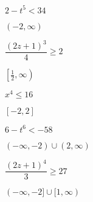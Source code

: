 \documentclass{ximera}
\begin{document}
\begin{question}
$2 - t^5 <  34$    %
\begin{solution}
$(-2, \infty)$ \vphantom{$\left[ \frac{1}{2}, \infty \right)$}
\end{solution}

\end{question}

\begin{question}
$\dfrac{(2z+1)^3}{4} \geq 2$ %

\begin{solution}
$\left[ \frac{1}{2}, \infty \right)$

\end{solution}

\end{question}

\begin{question}
$x^4 \leq 16$    %
\begin{solution}
$[-2,2]$
\end{solution}

\end{question}

\begin{question}
$6-t^6 < -58$    %
\begin{solution}
$(-\infty, -2) \cup (2, \infty)$
\end{solution}

\end{question}

\begin{question}
$\dfrac{(2z+1)^4}{3} \geq 27$ %
\begin{solution}
$(-\infty, -2] \cup [1, \infty)$
\end{solution}

\end{question}
\end{document}
